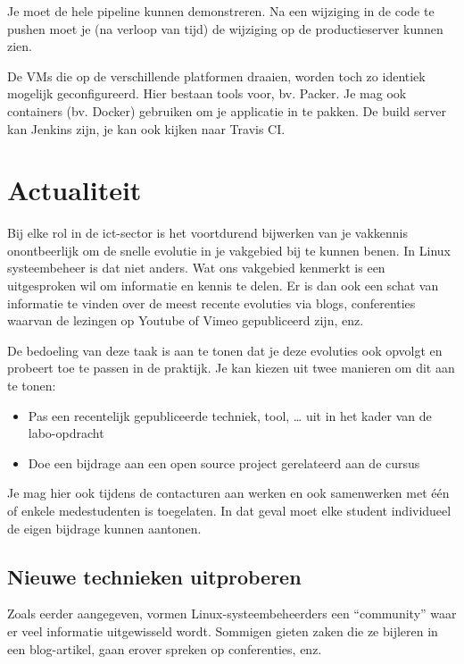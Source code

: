 Je moet de hele pipeline kunnen demonstreren. Na een wijziging in de code te pushen moet je (na verloop van tijd) de wijziging op de productieserver kunnen zien.

De VMs die op de verschillende platformen draaien, worden toch zo identiek mogelijk geconfigureerd. Hier bestaan tools voor, bv. Packer.  Je mag ook containers (bv. Docker) gebruiken om je applicatie in te pakken. De build server kan Jenkins zijn, je kan ook kijken naar Travis CI.

\section{Actualiteit}
\label{actualiteit}

Bij elke rol in de ict-sector is het voortdurend bijwerken van je
vakkennis onontbeerlijk om de snelle evolutie in je vakgebied bij te
kunnen benen. In Linux systeembeheer is dat niet anders. Wat ons
vakgebied kenmerkt is een uitgesproken wil om informatie en kennis te
delen. Er is dan ook een schat van informatie te vinden over de meest
recente evoluties via blogs, conferenties waarvan de lezingen op Youtube
of Vimeo gepubliceerd zijn, enz.

De bedoeling van deze taak is aan te tonen dat je deze evoluties ook
opvolgt en probeert toe te passen in de praktijk. Je kan kiezen uit twee
manieren om dit aan te tonen:

\begin{itemize}
\item
  Pas een recentelijk gepubliceerde techniek, tool, \ldots{} uit in het
  kader van de labo-opdracht
\item
  Doe een bijdrage aan een open source project gerelateerd aan de cursus
\end{itemize}

Je mag hier ook tijdens de contacturen aan werken en ook samenwerken met
één of enkele medestudenten is toegelaten. In dat geval moet elke
student individueel de eigen bijdrage kunnen aantonen.

\subsection{Nieuwe technieken
uitproberen}\label{nieuwe-technieken-uitproberen}

Zoals eerder aangegeven, vormen Linux-systeembeheerders een
``community'' waar er veel informatie uitgewisseld wordt. Sommigen
gieten zaken die ze bijleren in een blog-artikel, gaan erover spreken op
conferenties, enz.

